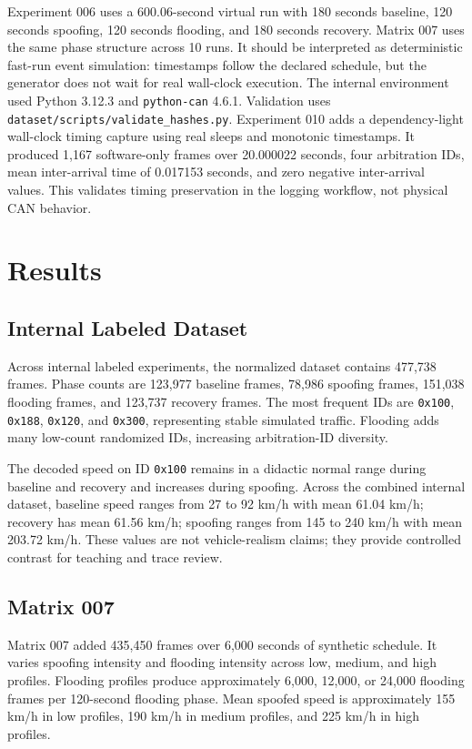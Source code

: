 \documentclass[conference]{IEEEtran}
\begin{document}
Experiment 006 uses a 600.06-second virtual run with 180 seconds baseline, 120 seconds spoofing, 120 seconds flooding, and 180 seconds recovery. Matrix 007 uses the same phase structure across 10 runs. It should be interpreted as deterministic fast-run event simulation: timestamps follow the declared schedule, but the generator does not wait for real wall-clock execution. The internal environment used Python 3.12.3 and \texttt{python-can} 4.6.1. Validation uses \texttt{dataset/scripts/validate\_hashes.py}. Experiment 010 adds a dependency-light wall-clock timing capture using real sleeps and monotonic timestamps. It produced 1,167 software-only frames over 20.000022 seconds, four arbitration IDs, mean inter-arrival time of 0.017153 seconds, and zero negative inter-arrival values. This validates timing preservation in the logging workflow, not physical CAN behavior.

\section{Results}
\subsection{Internal Labeled Dataset}
Across internal labeled experiments, the normalized dataset contains 477,738 frames. Phase counts are 123,977 baseline frames, 78,986 spoofing frames, 151,038 flooding frames, and 123,737 recovery frames. The most frequent IDs are \texttt{0x100}, \texttt{0x188}, \texttt{0x120}, and \texttt{0x300}, representing stable simulated traffic. Flooding adds many low-count randomized IDs, increasing arbitration-ID diversity.

The decoded speed on ID \texttt{0x100} remains in a didactic normal range during baseline and recovery and increases during spoofing. Across the combined internal dataset, baseline speed ranges from 27 to 92 km/h with mean 61.04 km/h; recovery has mean 61.56 km/h; spoofing ranges from 145 to 240 km/h with mean 203.72 km/h. These values are not vehicle-realism claims; they provide controlled contrast for teaching and trace review.

\subsection{Matrix 007}
Matrix 007 added 435,450 frames over 6,000 seconds of synthetic schedule. It varies spoofing intensity and flooding intensity across low, medium, and high profiles. Flooding profiles produce approximately 6,000, 12,000, or 24,000 flooding frames per 120-second flooding phase. Mean spoofed speed is approximately 155 km/h in low profiles, 190 km/h in medium profiles, and 225 km/h in high profiles.
\end{document}
